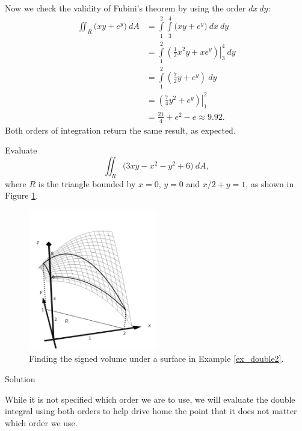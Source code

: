 \begin{example}
Now we check the validity of Fubini's theorem by using the order $dx\ dy$:
\allowdisplaybreaks
\begin{align*}
\iint_R\big(xy+e^y\big) \ dA &= \int\limits_1^2\int\limits_3^4\big(xy+e^y\big)\ dx \ dy \\
		&= \int\limits_1^2\left.\left(\frac12x^2y+xe^y\right)\right|_3^4\ dy\\
		&= \int\limits_1^2\left(\frac72y+e^y\right)\ dy\\
		&= \left.\left(\frac74y^2+e^y\right)\right|_1^2\\
		&=\frac{21}4+e^2-e\approx 9.92.
\end{align*}
Both orders of integration return the same result, as expected.
\end{example}


\begin{example}\label{ex_double2}
Evaluate $$\iint_R \big(3xy-x^2-y^2+6\big)\ dA,$$
where $R$ is the triangle bounded by $x=0$, $y=0$ and  $x/2+y=1$, as shown in Figure \ref{fig_double_8}.

\begin{figure}[H]
	\begin{center}
			\includegraphics[width=0.5\textwidth]{fig_double_8}
	\caption{Finding the signed volume under a surface in Example \ref{ex_double2}.}
	\label{fig_double_8}
	\end{center}
\end{figure}


Solution 

While it is not specified which order we are to use, we will evaluate the double integral using both orders to help drive home the point that it does not matter which order we use.\\



\end{example}
